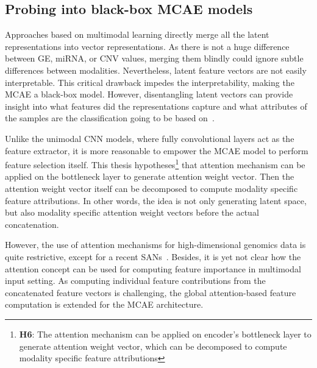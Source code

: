 \subsection{Probing into black-box MCAE models}
Approaches based on multimodal learning directly merge all the latent representations into vector representations. As there is not a huge difference between GE, miRNA, or CNV values, merging them blindly could ignore subtle differences between modalities. 
Nevertheless, latent feature vectors are not easily interpretable. This critical drawback impedes the interpretability, making the MCAE a black-box model. However, disentangling latent vectors can provide insight into what features did the representations capture and what attributes of the samples are the classification going to be based on~\cite{karimTCBB2020}. 

\hspace*{3.5mm} Unlike the unimodal CNN models, where fully convolutional layers act as the feature extractor, it is more reasonable to empower the MCAE model to perform feature selection itself. This thesis hypotheses\footnote{\textbf{H6}: The attention mechanism can be applied on encoder's bottleneck layer to generate attention weight vector, which can be decomposed to compute modality specific feature attributions} that attention mechanism can be applied on the bottleneck layer to generate attention weight vector. Then the attention weight vector itself can be decomposed to compute modality specific feature attributions. In other words, the idea is not only generating latent space, but also modality specific attention weight vectors before the actual concatenation. %

\hspace*{3.5mm} However, the use of attention mechanisms for high-dimensional genomics data is quite restrictive, except for a recent SANs~\cite{vskrlj2020feature}. Besides, it is yet not clear how the attention concept can be used for computing feature importance in multimodal input setting. As computing individual feature contributions from the concatenated feature vectors is challenging, the global attention-based feature computation is extended for the MCAE architecture. 


